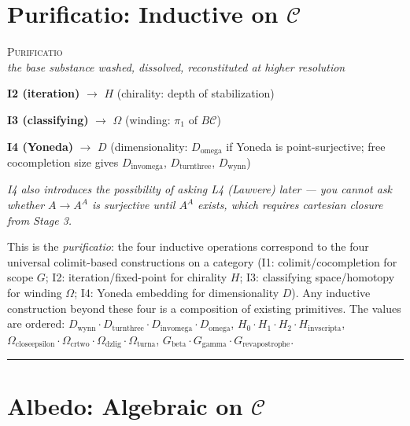 \documentclass[12pt,a4paper]{article}
\begin{document}
\section{Purificatio: Inductive on $\mathcal{C}$}

\begin{center}
\vspace{0.5em}
{\large\textsc{Purificatio}}
\\[4pt]
{\small\itshape the base substance washed, dissolved, reconstituted at higher resolution}
\vspace{0.4em}
\end{center}

\noindent\textbf{I2 (iteration)} $\to$ $H$ (chirality: depth of stabilization)

\noindent\textbf{I3 (classifying)} $\to$ $\Omega$ (winding: $\pi_1$ of $B\mathcal{C}$)

\noindent\textbf{I4 (Yoneda)} $\to$ $D$ (dimensionality: $D_{\text{omega}}$ if Yoneda is point-surjective; free cocompletion size gives $D_{\text{invomega}}$, $D_{\text{turnthree}}$, $D_{\text{wynn}}$)

{\small\itshape I4 also introduces the possibility of asking L4 (Lawvere) later --- you cannot ask whether $A \to A^A$ is surjective until $A^A$ exists, which requires cartesian closure from Stage 3.}

This is the \emph{purificatio}: the four inductive operations correspond to the four universal colimit-based constructions on a category (I1: colimit/cocompletion for scope $G$; I2: iteration/fixed-point for chirality $H$; I3: classifying space/homotopy for winding $\Omega$; I4: Yoneda embedding for dimensionality $D$). Any inductive construction beyond these four is a composition of existing primitives. The values are ordered: $D_{\text{wynn}} \cdot D_{\text{turnthree}} \cdot D_{\text{invomega}} \cdot D_{\text{omega}}$, $H_0 \cdot H_1 \cdot H_2 \cdot H_{\text{invscripta}}$, $\Omega_{\text{closeepsilon}} \cdot \Omega_{\text{crtwo}} \cdot \Omega_{\text{dzlig}} \cdot \Omega_{\text{turna}}$, $G_{\text{beta}} \cdot G_{\text{gamma}} \cdot G_{\text{revapostrophe}}$.

\begin{center}
\rule{0.5\textwidth}{0.4pt}
\end{center}
\section{Albedo: Algebraic on $\mathcal{C}$}
\end{document}

